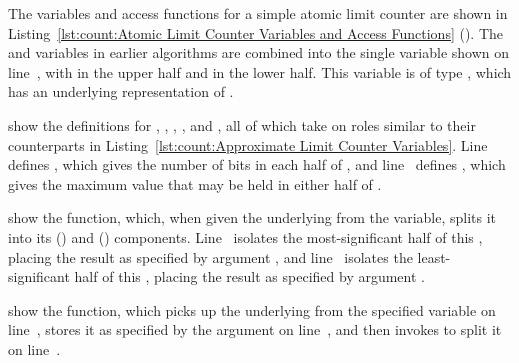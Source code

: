 \begin{fcvref}
The variables and access functions for a simple atomic limit counter
are shown in
Listing~\ref{lst:count:Atomic Limit Counter Variables and Access Functions}
().
The  and  variables in earlier algorithms
are combined into the single variable  shown on
line~, with  in the upper half and  in
the lower half.
This variable is of type , which has an underlying
representation of .

 show the definitions for , ,
, , and , all of which
take on roles similar to their counterparts in
Listing~\ref{lst:count:Approximate Limit Counter Variables}.
Line~ defines , which gives the number of bits in each half
of , and line~ defines , which
gives the maximum value that may be held in either half of
.
\end{fcvref}

\QuickQuizEnd

\begin{fcvref}
 show the 
function, which,
when given the underlying  from the
 variable, splits it into its
 ()
and  () components.
Line~ isolates the most-significant half of this ,
placing the result as specified by argument ,
and line~ isolates the least-significant half of this ,
placing the result as specified by argument .
\end{fcvref}

\begin{fcvref}
 show the  function, which
picks up the underlying  from the specified variable
on line~, stores it as specified by the  argument on
line~, and then invokes  to split
it on line~.
\end{fcvref}

